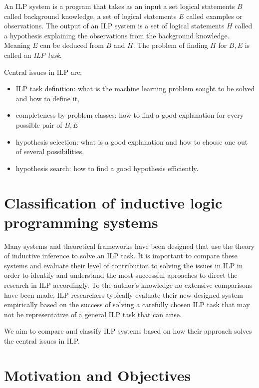 An ILP system is a program that takes as an input a set logical statements $B$ called background knowledge, a set of logical statements $E$ called examples or observations. The output of an ILP system is a set of logical statements $H$ called a hypothesis explaining the observations from the background knowledge. Meaning $E$ can be deduced from $B$ and $H$. The problem of finding $H$ for $B, E$ is called an \emph{ILP task}.

Central issues in ILP are:
\begin{itemize}
\item ILP task definition: what is the machine learning problem sought to be solved and how to define it,
\item completeness by problem classes: how to find a good explanation for every possible pair of $B, E$
\item hypothesis selection: what is a good explanation and how to choose one out of several possibilities,
\item hypothesis search: how to find a good hypothesis efficiently.
\end{itemize}

\section{Classification of inductive logic programming systems}
Many systems and theoretical frameworks have been designed that use the theory of inductive inference to solve an ILP task. It is important to compare these systems and evaluate their level of contribution to solving the issues in ILP in order to identify and understand the most successful aproaches to direct the research in ILP accordingly. To the author's knowledge no extensive comparisons have been made. ILP researchers typically evaluate their new designed system empirically based on the success of solving a carefully chosen ILP task that may not be representative of a general ILP task that can arise.

We aim to compare and classify ILP systems based on how their approach solves the central issues in ILP.

\section{Motivation and Objectives}

